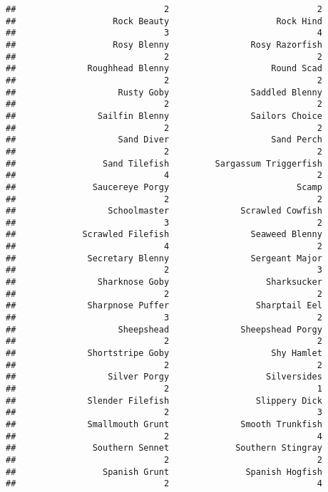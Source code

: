 \documentclass[
]{article}
\begin{document}
\begin{verbatim}
##                             2                             2 
##                   Rock Beauty                     Rock Hind 
##                             3                             4 
##                   Rosy Blenny                Rosy Razorfish 
##                             2                             2 
##              Roughhead Blenny                    Round Scad 
##                             2                             2 
##                    Rusty Goby                Saddled Blenny 
##                             2                             2 
##                Sailfin Blenny                Sailors Choice 
##                             2                             2 
##                    Sand Diver                    Sand Perch 
##                             2                             2 
##                 Sand Tilefish         Sargassum Triggerfish 
##                             4                             2 
##               Saucereye Porgy                         Scamp 
##                             2                             2 
##                  Schoolmaster              Scrawled Cowfish 
##                             3                             2 
##             Scrawled Filefish                Seaweed Blenny 
##                             4                             2 
##              Secretary Blenny                Sergeant Major 
##                             2                             3 
##                Sharknose Goby                   Sharksucker 
##                             2                             2 
##              Sharpnose Puffer                 Sharptail Eel 
##                             3                             2 
##                    Sheepshead              Sheepshead Porgy 
##                             2                             2 
##              Shortstripe Goby                    Shy Hamlet 
##                             2                             2 
##                  Silver Porgy                   Silversides 
##                             2                             1 
##              Slender Filefish                 Slippery Dick 
##                             2                             3 
##              Smallmouth Grunt              Smooth Trunkfish 
##                             2                             4 
##               Southern Sennet             Southern Stingray 
##                             2                             2 
##                 Spanish Grunt               Spanish Hogfish 
##                             2                             4 

\end{verbatim}
\end{document}
